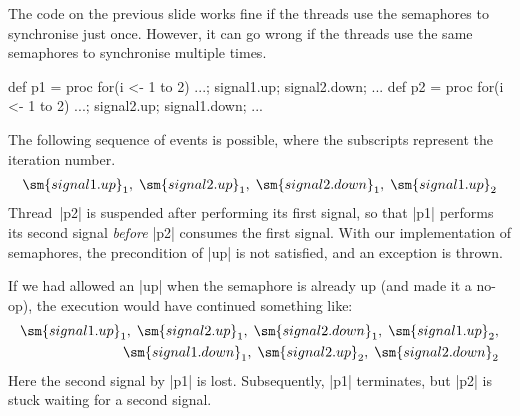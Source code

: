 
\begin{slide}

The code on the previous slide works fine if the threads use the semaphores to
synchronise just once.  However, it can go wrong if the threads use the same
semaphores to synchronise multiple times. 
%
\begin{scala}
def p1 = proc{ for(i <- 1 to 2){ ...; signal1.up; signal2.down; ... } }
def p2 = proc{ for(i <- 1 to 2){ ...; signal2.up; signal1.down; ... } }
\end{scala}
%
The following sequence of events is possible, where the
subscripts represent the iteration number.
\[
\begin{align}
\sm{signal1.up}_1,\; \sm{signal2.up}_1,\; \sm{signal2.down}_1,\;
   \sm{signal1.up}_2
\end{align}
\]
Thread~|p2| is suspended after performing its first signal, so that |p1|
performs its second signal \emph{before} |p2| consumes the first signal. 
With our implementation of semaphores, the precondition of |up| is not
satisfied, and an exception is thrown. 
\end{slide}


\begin{slide}

If we had allowed an |up| when the semaphore is already up (and made it a
no-op), the execution would have continued something like:
\[
\begin{align}
\sm{signal1.up}_1,\; \sm{signal2.up}_1,\; \sm{signal2.down}_1,\;
   \sm{signal1.up}_2, \\
\sm{signal1.down}_1,\; \sm{signal2.up}_2,\; \sm{signal2.down}_2
\end{align}
\]
Here the second signal by |p1| is lost.  Subsequently, |p1| terminates, but
|p2| is stuck waiting for a second signal.
\end{slide}


